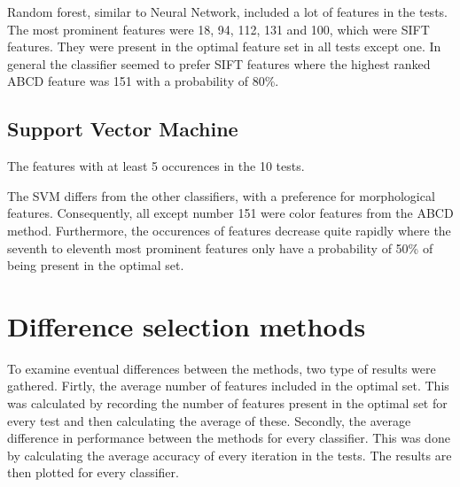 \documentclass{kththesis}
\begin{document}
Random forest, similar to Neural Network, included a lot of features in the tests. The most prominent features were 18, 94, 112, 131 and 100, which were SIFT features. They were present in the optimal feature set in all tests except one. In general the classifier seemed to prefer SIFT features where the highest ranked ABCD feature was 151 with a probability of 80\%.

\subsection{Support Vector Machine}

\begin{table}[h!]
  \begin{center}
    \caption{The features with at least 5 occurences in the 10 tests.}
  \end{center}
\end{table}

The SVM differs from the other classifiers, with a preference for morphological features. Consequently, all except number 151 were color features from the ABCD method. Furthermore, the occurences of features decrease quite rapidly where the seventh to eleventh most prominent features only have a probability of 50\% of being present in the optimal set. 


\section{Difference selection methods}

To examine eventual differences between the methods, two type of results were gathered. Firtly, the average number of features included in the optimal set. This was calculated by recording the number of features present in the optimal set for every test and then calculating the average of these. Secondly, the average difference in performance between the methods for every classifier. This was done by calculating the average accuracy of every iteration in the tests. The results are then plotted for every classifier. 
\end{document}
